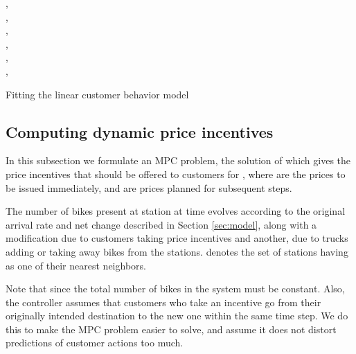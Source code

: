 \documentclass{article}
\begin{document}
\begin{algorithm}
  \begin{algorithmic}[1]
    \Require ,\\
    , \\
    , \\
    , \\
    , \\
    , \\
       \State  {}
    \State  {} 
    \State 
    \State 
    \EndFor
    \State  {}
    \State 
    \EndFor
    \State 
    \EndFor
  \end{algorithmic}
  \caption{Fitting the linear customer behavior model}
  \label{alg:gen-lin-model}
\end{algorithm}
\subsection{Computing dynamic price incentives}
\label{sec:mpc}
In this subsection we formulate an MPC problem, the solution of which gives the
price incentives  that should be offered to customers for
, where  are the prices to be issued immediately, and
 are prices planned for subsequent steps.

The number  of bikes present at station  at time  evolves
according to the original arrival rate  and net change 
described in Section \ref{sec:model}, along with a modification
 due to customers taking price incentives and
another,  due to trucks adding or taking away bikes from the
stations.  denotes the set of stations having  as one of their
nearest neighbors.


Note that  since the total number of bikes in
the system must be constant. Also, the controller assumes that customers who
take an incentive go from their originally intended destination to the new one
within the same time step. We do this to make the MPC problem easier to solve,
and assume it does not distort predictions of customer actions too much.
\end{document}
